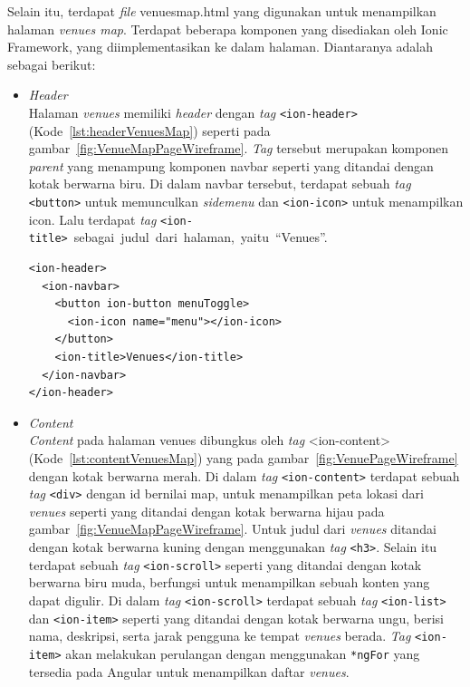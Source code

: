 \begin{enumerate}
	Selain itu, terdapat \textit{file} venues\textunderscore map.html yang digunakan untuk menampilkan halaman \textit{venues map}. Terdapat beberapa komponen yang disediakan oleh Ionic Framework, yang diimplementasikan ke dalam halaman. Diantaranya adalah sebagai berikut:
\newpage
	\begin{itemize}
		\item \textit{Header} \\
		 Halaman \textit{venues} memiliki \textit{header} dengan \textit{tag} \texttt{<ion-header>} (Kode~\ref{lst:headerVenuesMap}) seperti pada gambar~\ref{fig:VenueMapPageWireframe}. \textit{Tag} tersebut merupakan komponen \textit{parent} yang menampung komponen navbar seperti yang ditandai dengan kotak berwarna biru. Di dalam navbar tersebut, terdapat sebuah \textit{tag} \texttt{<button>} untuk memunculkan \textit{sidemenu} dan \texttt{<ion-icon>} untuk menampilkan icon. Lalu terdapat \textit{tag} \texttt{<ion-title>}~sebagai~judul~dari~halaman,~yaitu~``Venues''.
		
\begin{lstlisting}[label={lst:headerVenuesMap}, caption=\textit{Header} pada venues\textunderscore map.html]
<ion-header>
  <ion-navbar>
    <button ion-button menuToggle>
      <ion-icon name="menu"></ion-icon>
    </button>
    <ion-title>Venues</ion-title>
  </ion-navbar>
</ion-header>
\end{lstlisting}

		\item \textit{Content} \\
		\textit{Content} pada halaman venues dibungkus oleh \textit{tag} <ion-content> (Kode~\ref{lst:contentVenuesMap}) yang pada gambar~\ref{fig:VenuePageWireframe} dengan kotak berwarna merah. Di dalam \textit{tag} \texttt{<ion-content>} terdapat sebuah \textit{tag} \texttt{<div>} dengan id bernilai map, untuk menampilkan peta lokasi dari \textit{venues} seperti yang ditandai dengan kotak berwarna hijau pada gambar~\ref{fig:VenueMapPageWireframe}. Untuk judul dari \textit{venues} ditandai dengan kotak berwarna kuning dengan menggunakan \textit{tag} \texttt{<h3>}. Selain itu terdapat sebuah \textit{tag} \texttt{<ion-scroll>} seperti yang ditandai dengan kotak berwarna biru muda, berfungsi untuk menampilkan sebuah konten yang dapat digulir. Di dalam \textit{tag} \texttt{<ion-scroll>} terdapat sebuah \textit{tag} \texttt{<ion-list>} dan \texttt{<ion-item>} seperti yang ditandai dengan kotak berwarna ungu, berisi nama, deskripsi, serta jarak pengguna ke tempat \textit{venues} berada. \textit{Tag} \texttt{<ion-item>} akan melakukan perulangan dengan menggunakan \texttt{*ngFor} yang tersedia pada Angular untuk menampilkan daftar \textit{venues}.
		

\end{itemize}
\end{enumerate}
